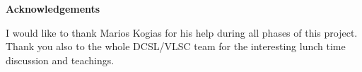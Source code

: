 \vspace*{\fill}
\begin{centering}
\textbf{Acknowledgements}

I would like to thank Marios Kogias for his help during all phases of this project.
Thank you also to the whole DCSL/VLSC team for the interesting lunch time discussion and teachings.
\end{centering}
\vspace*{\fill}
